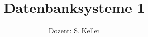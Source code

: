 \documentclass{scrartcl}
\title{Datenbanksysteme 1}
\subtitle{Dozent: S. Keller}
\begin{document}
\begin{titlepage}
    \maketitle
    \thispagestyle{empty}
\end{titlepage}
\newpage

\tableofcontents
\newpage

%
\end{document}
